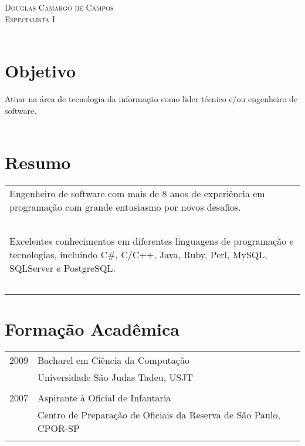 \documentclass[a4paper, oneside, final]{scrartcl}
\begin{document}
\begin{center}
\textsc{{\Huge Douglas Camargo de Campos} \\ Especialista I}\\
\ \\
\end{center}

\section{Objetivo}
Atuar na área de tecnologia da informação como lider técnico e/ou engenheiro de software. \\ \ \\

%

\section{Resumo}

\begin{tabularx}{0.97\linewidth}{X}
Engenheiro de software com mais de 8 anos de experiência em programação com grande entusiasmo por novos desafios. \\ \ \\

Excelentes conhecimentos em diferentes linguagens de programação e tecnologias, incluindo C\#, C/C++, Java, Ruby, Perl, MySQL, SQLServer e PostgreSQL. \\ \ \\
\end{tabularx}

\section{Formação Acadêmica}

\begin{tabularx}{0.97\linewidth}{p{2cm}X}
2009 & Bacharel em Ciência da Computação\\
     & Universidade São Judas Tadeu, USJT\\ \\

2007 & Aspirante à Oficial de Infantaria\\
     & Centro de Preparação de Oficiais da Reserva de São Paulo, CPOR-SP\\ \\
\end{tabularx}
\end{document}
